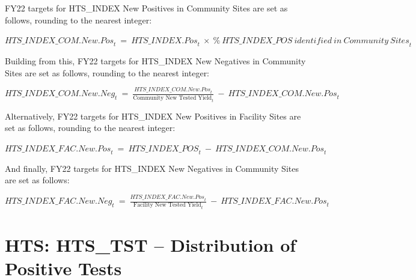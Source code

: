 \documentclass[
  openany]{book}
\begin{document}
FY22 targets for HTS\_INDEX New Positives in Community Sites are set as
follows, rounding to the nearest integer:

\begin{center} ${HTS\_ INDEX\_ COM.New.Pos}_{t}\  = \ {HTS\_ INDEX.Pos}_{t}\  \times \ {\%\ HTS\_ INDEX\_ POS\ identified\ in\ Community\ Sites}_{t}$ \end{center}

Building from this, FY22 targets for HTS\_INDEX New Negatives in
Community Sites are set as follows, rounding to the nearest integer:

\begin{center} ${HTS\_ INDEX\_ COM.New.Neg}_{t}\  = \ \frac{{HTS\_ INDEX\_ COM.New.Pos}_{t}}{\text{Community New Tested Yield}_{t}}\  - \ {HTS\_ INDEX\_ COM.New.Pos}_{t}$ \end{center}

Alternatively, FY22 targets for HTS\_INDEX New Positives in Facility
Sites are set as follows, rounding to the nearest integer:

\begin{center} ${HTS\_ INDEX\_ FAC.New.Pos}_{t}\  = \ {HTS\_ INDEX\_ POS}_{t}\  - \ {HTS\_ INDEX\_ COM.New.Pos}_{t}$ \end{center}

And finally, FY22 targets for HTS\_INDEX New Negatives in Community Sites
are set as follows:

\begin{center} ${HTS\_ INDEX\_ FAC.New.Neg}_{t}\  = \ \frac{{HTS\_ INDEX\_ FAC.New.Pos}_{t}}{\text{Facility New Tested Yield}_{t}}\  - \ {HTS\_ INDEX\_ FAC.New.Pos}_{t}$ \end{center}

\hypertarget{hts-hts_tst-distribution-of-positive-tests}{%
\section{HTS: HTS\_TST -- Distribution of Positive Tests}\label{hts-hts_tst-distribution-of-positive-tests}}
\end{document}
